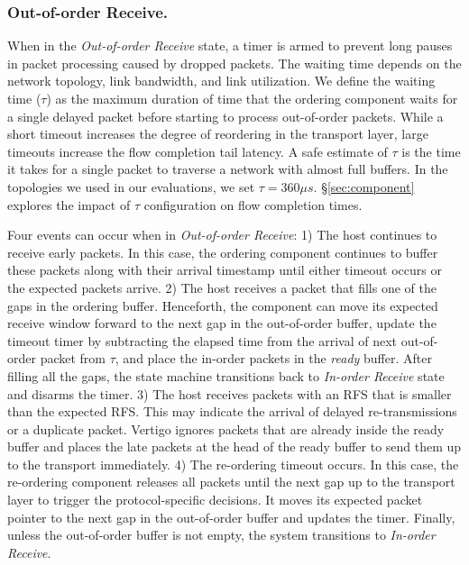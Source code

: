 \subsubsection{Out-of-order Receive.} When in the \textit{Out-of-order Receive} state, a timer is armed to prevent long pauses in packet processing caused by dropped packets. The waiting time depends on the network topology, link bandwidth, and link utilization. We define the waiting time ($\tau$) as the maximum duration of time that the ordering component waits for a single delayed packet before starting to process out-of-order packets. While a short timeout increases the degree of reordering in the transport layer, large timeouts increase the flow completion tail latency. A safe estimate of $\tau$ is the time it takes for a single packet to traverse a network with almost full buffers. In the topologies we used in our evaluations, we set $\tau = 360\mu s$. \S\ref{sec:component} explores the impact of $\tau$ configuration on flow completion times.

Four events can occur when in \textit{Out-of-order Receive}: 1) The host continues to receive early packets. In this case, the ordering component continues to buffer these packets along with their arrival timestamp until either timeout occurs or the expected packets arrive. 2) The host receives a packet that fills one of the gaps in the ordering buffer. Henceforth, the component can move its expected receive window forward to the next gap in the out-of-order buffer, update the timeout timer by subtracting the elapsed time from the arrival of next out-of-order packet from $\tau$, and place the in-order packets in the \textit{ready} buffer. After filling all the gaps, the state machine transitions back to \textit{In-order Receive} state and disarms the timer. 3) The host receives packets with an RFS that is smaller than the expected RFS. This may indicate the arrival of delayed re-transmissions or a duplicate packet. Vertigo ignores packets that are already inside the ready buffer and places the late packets at the head of the ready buffer to send them up to the transport immediately. 4) The re-ordering timeout occurs. In this case, the re-ordering component releases all packets until the next gap up to the transport layer to trigger the protocol-specific decisions. It moves its expected packet pointer to the next gap in the out-of-order buffer and updates the timer. Finally, unless the out-of-order buffer is not empty, the system transitions to \textit{In-order Receive}.


